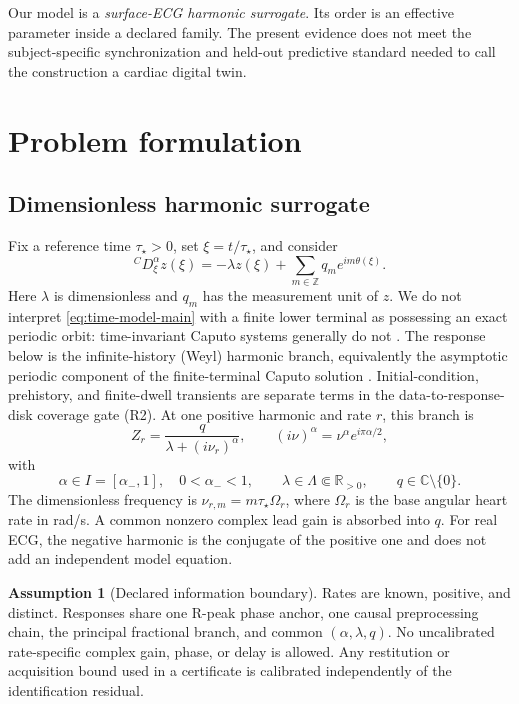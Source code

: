 \documentclass[11pt]{article}
\theoremstyle{definition}
\newtheorem{assumption}[theorem]{Assumption}
\theoremstyle{remark}
\newcommand{\C}{\mathbb C}
\newcommand{\R}{\mathbb R}
\begin{document}
Our model is a \emph{surface-ECG harmonic surrogate}.  Its order is an
effective parameter inside a declared family.  The present evidence does not
meet the subject-specific synchronization and held-out predictive standard
needed to call the construction a cardiac digital twin.

\section{Problem formulation}

\subsection{Dimensionless harmonic surrogate}

Fix a reference time $\tau_\star>0$, set $\xi=t/\tau_\star$, and consider
\begin{equation}
 {}^C D_\xi^\alpha z(\xi)
 =-\lambda z(\xi)+\sum_{m\in\mathbb Z}q_m e^{im\theta(\xi)} .
 \label{eq:time-model-main}
\end{equation}
Here $\lambda$ is dimensionless and $q_m$ has the measurement unit of $z$.
We do not interpret \eqref{eq:time-model-main} with a finite lower terminal as
possessing an exact periodic orbit: time-invariant Caputo systems generally do
not \cite{tavazoei2009}.  The response below is the infinite-history (Weyl)
harmonic branch, equivalently the asymptotic periodic component of the
finite-terminal Caputo solution \cite{duan2022}.  Initial-condition,
prehistory, and finite-dwell transients are separate terms in the
data-to-response-disk coverage gate (R2).  At
one positive harmonic and rate $r$, this branch is
\begin{equation}
 Z_r=\frac{q}{\lambda+(i\nu_r)^\alpha},\qquad
 (i\nu)^\alpha=\nu^\alpha e^{i\pi\alpha/2},
 \label{eq:response-main}
\end{equation}
with
\[
 \alpha\in I=[\alpha_-,1],\quad 0<\alpha_-<1,
 \qquad \lambda\in\Lambda\Subset\R_{>0},\qquad q\in\C\setminus\{0\}.
\]
The dimensionless frequency is $\nu_{r,m}=m\tau_\star\Omega_r$, where
$\Omega_r$ is the base angular heart rate in rad/s.  A common nonzero complex
lead gain is absorbed into $q$.  For real ECG, the negative harmonic
is the conjugate of the positive one and does not add an independent model
equation.

\begin{assumption}[Declared information boundary]
\label{ass:boundary-main}
Rates are known, positive, and distinct.  Responses share one R-peak phase
anchor, one causal preprocessing chain, the principal fractional branch, and
common $(\alpha,\lambda,q)$.  No uncalibrated rate-specific complex gain,
phase, or delay is allowed.  Any restitution or acquisition bound used in a
certificate is calibrated independently of the identification residual.
\end{assumption}
\end{document}
